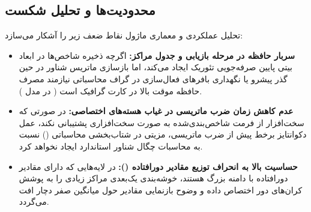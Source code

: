 \subsection{محدودیت‌ها و تحلیل شکست}
تحلیل عملکردی و معماری ماژول  نقاط ضعف زیر را آشکار می‌سازد:
\begin{itemize}
    \item \textbf{سربار حافظه در مرحله بازیابی و جدول مراکز:} اگرچه ذخیره شاخص‌ها در ابعاد بیتی پایین صرفه‌جویی تئوریک ایجاد می‌کند، اما بازسازی ماتریس شناور در حین گذر پیشرو یا نگهداری بافرهای فعال‌سازی در گراف محاسباتی  نیازمند مصرف حافظه موقت بالا در کارت گرافیک است ( در مدل ).
    \item \textbf{عدم کاهش زمان ضرب ماتریسی در غیاب هسته‌های اختصاصی:} در صورتی که سخت‌افزار از فرمت شاخص‌بندی‌شده به صورت سخت‌افزاری پشتیبانی نکند، عمل دکوانتایز برخط پیش از ضرب ماتریسی، مزیتی در شتاب‌بخشی محاسباتی () نسبت به محاسبات چگال شناور استاندارد ایجاد نخواهد کرد.
    \item \textbf{حساسیت بالا به انحراف توزیع مقادیر دورافتاده ():} در لایه‌هایی که دارای مقادیر دورافتاده با دامنه بزرگ هستند، خوشه‌بندی یک‌بعدی مراکز زیادی را به پوشش کران‌های دور اختصاص داده و وضوح بازنمایی مقادیر حول میانگین صفر دچار افت می‌گردد.
\end{itemize}
